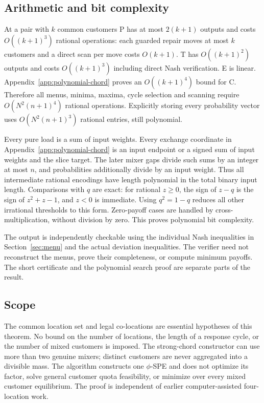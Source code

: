 \documentclass[11pt,a4paper]{article}
\begin{document}
\subsection{Arithmetic and bit complexity}
At a pair with $k$ common customers P has at most $2(k+1)$ outputs and
costs $O((k+1)^3)$ rational operations: each guarded repair moves at most
$k$ customers and a direct scan per move costs $O(k+1)$.
T has $O((k+1)^2)$ outputs and costs $O((k+1)^3)$ including direct Nash
verification. E is linear. Appendix~\ref{app:polynomial-chord} proves an
$O((k+1)^4)$ bound for C. Therefore all menus, minima, maxima, cycle
selection and scanning require $O(N^2(n+1)^4)$ rational operations.
Explicitly storing every probability vector uses
$O(N^2(n+1)^3)$ rational entries, still polynomial.

Every pure load is a sum of input weights. Every exchange coordinate in
Appendix~\ref{app:polynomial-chord} is an input endpoint or a signed sum
of input weights and the slice target. The later mixer gaps divide such
sums by an integer at most $n$, and probabilities additionally divide by
an input weight. Thus all intermediate rational encodings have length
polynomial in the total binary input length. Comparisons with $q$ are
exact: for rational $z\ge0$, the sign of $z-q$ is the sign of
$z^2+z-1$, and $z<0$ is immediate. Using $q^2=1-q$ reduces all other
irrational thresholds to this form. Zero-payoff cases are handled by
cross-multiplication, without division by zero. This proves polynomial
bit complexity.

The output is independently checkable using the individual Nash inequalities
in Section~\ref{sec:menu} and the actual deviation inequalities. The
verifier need not reconstruct the menus, prove their completeness, or
compute minimum payoffs. The short certificate and the polynomial search
proof are separate parts of the result.

\subsection{Scope}
The common location set and legal co-locations are essential hypotheses of
this theorem. No bound on the number of locations, the length of a response
cycle, or the number of mixed customers is imposed. The strong-chord
constructor can use more than two genuine mixers; distinct customers are
never aggregated into a divisible mass. The algorithm constructs one
$\phi$-SPE and does not optimize its factor, solve general customer quota
feasibility, or minimize over every mixed customer equilibrium.
The proof is independent of earlier computer-assisted four-location work.
\end{document}
